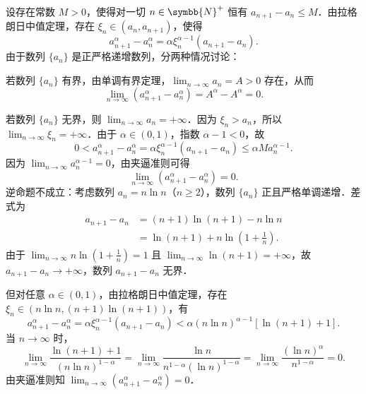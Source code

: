 \begin{myproof}
    设存在常数 $M > 0$，使得对一切 $n \in \symbb{N}^+$ 恒有 $a_{n+1} - a_n \leqslant M$．由拉格朗日中值定理，存在 $\xi_n \in (a_n, a_{n+1})$，使得
    \begin{equation}
        a_{n+1}^\alpha - a_n^\alpha = \alpha \xi_n^{\alpha - 1}(a_{n+1} - a_n).
    \end{equation}
    由于数列 $\{a_n\}$ 是正严格递增数列，分两种情况讨论：

    若数列 $\{a_n\}$ 有界，由单调有界定理，$\lim_{n\to\infty} a_n = A > 0$ 存在，从而
    \begin{equation}
        \lim_{n\to\infty} (a_{n+1}^\alpha - a_n^\alpha) = A^\alpha - A^\alpha = 0.
    \end{equation}

    若数列 $\{a_n\}$ 无界，则 $\lim_{n\to\infty} a_n = +\infty$．因为 $\xi_n > a_n$，所以 $\lim_{n\to\infty} \xi_n = +\infty$．由于 $\alpha \in (0, 1)$，指数 $\alpha - 1 < 0$，故
    \begin{equation}
        0 < a_{n+1}^\alpha - a_n^\alpha = \alpha \xi_n^{\alpha - 1}(a_{n+1} - a_n) \leqslant \alpha M a_n^{\alpha - 1}.
    \end{equation}
    因为 $\lim_{n\to\infty} a_n^{\alpha - 1} = 0$，由夹逼准则可得
    \begin{equation}
        \lim_{n\to\infty} (a_{n+1}^\alpha - a_n^\alpha) = 0.
    \end{equation}
    逆命题不成立：考虑数列 $a_n = n \ln n$（$n \geqslant 2$），数列 $\{a_n\}$ 正且严格单调递增．差式为
    \begin{equation}
        \begin{aligned}
            a_{n+1} - a_n & = (n+1)\ln(n+1) - n\ln n                       \\
                          & = \ln(n+1) + n\ln\left(1 + \frac{1}{n}\right).
        \end{aligned}
    \end{equation}
    由于 $\lim_{n\to\infty} n\ln\left(1 + \frac{1}{n}\right) = 1$ 且 $\lim_{n\to\infty} \ln(n+1) = +\infty$，故 $a_{n+1} - a_n \to +\infty$，数列 $a_{n+1} - a_n$ 无界．

    但对任意 $\alpha \in (0, 1)$，由拉格朗日中值定理，存在 $\xi_n \in (n\ln n, (n+1)\ln(n+1))$，有
    \begin{equation}
        a_{n+1}^\alpha - a_n^\alpha = \alpha \xi_n^{\alpha - 1}(a_{n+1} - a_n) < \alpha (n\ln n)^{\alpha - 1}\left[ \ln(n+1) + 1 \right].
    \end{equation}
    当 $n \to \infty$ 时，
    \begin{equation}
        \lim_{n\to\infty} \frac{\ln(n+1) + 1}{(n\ln n)^{1 - \alpha}} = \lim_{n\to\infty} \frac{\ln n}{n^{1 - \alpha} (\ln n)^{1 - \alpha}} = \lim_{n\to\infty} \frac{(\ln n)^\alpha}{n^{1 - \alpha}} = 0.
    \end{equation}
    由夹逼准则知 $\lim_{n\to\infty} (a_{n+1}^\alpha - a_n^\alpha) = 0$．
\end{myproof}

